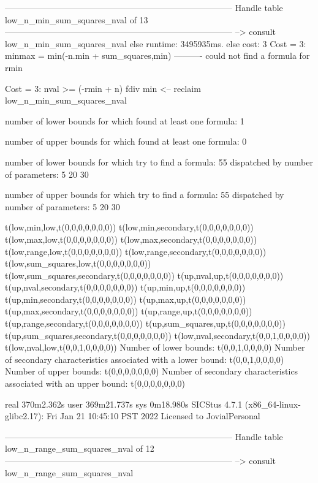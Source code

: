 --------------------------------------------------------------------------------
Handle table low_n_min_sum_squares_nval of 13
--------------------------------------------------------------------------------
--> consult low_n_min_sum_squares_nval
else runtime: 3495935ms. else cost: 3
Cost =  3:  minmax = min(-n.min + sum_squares,min) %
----------
could not find a formula for rmin

Cost =  3:  nval >= (-rmin + n) fdiv min %
<-- reclaim low_n_min_sum_squares_nval

number of lower bounds for which found at least one formula: 1

number of upper bounds for which found at least one formula: 0

number of lower bounds for which try to find a formula: 55
dispatched by number of parameters: 5  20  30

number of upper bounds for which try to find a formula: 55
dispatched by number of parameters: 5  20  30

t(low,min,low,t(0,0,0,0,0,0,0))
t(low,min,secondary,t(0,0,0,0,0,0,0))
t(low,max,low,t(0,0,0,0,0,0,0))
t(low,max,secondary,t(0,0,0,0,0,0,0))
t(low,range,low,t(0,0,0,0,0,0,0))
t(low,range,secondary,t(0,0,0,0,0,0,0))
t(low,sum_squares,low,t(0,0,0,0,0,0,0))
t(low,sum_squares,secondary,t(0,0,0,0,0,0,0))
t(up,nval,up,t(0,0,0,0,0,0,0))
t(up,nval,secondary,t(0,0,0,0,0,0,0))
t(up,min,up,t(0,0,0,0,0,0,0))
t(up,min,secondary,t(0,0,0,0,0,0,0))
t(up,max,up,t(0,0,0,0,0,0,0))
t(up,max,secondary,t(0,0,0,0,0,0,0))
t(up,range,up,t(0,0,0,0,0,0,0))
t(up,range,secondary,t(0,0,0,0,0,0,0))
t(up,sum_squares,up,t(0,0,0,0,0,0,0))
t(up,sum_squares,secondary,t(0,0,0,0,0,0,0))
t(low,nval,secondary,t(0,0,1,0,0,0,0))
t(low,nval,low,t(0,0,1,0,0,0,0))
Number of lower bounds:                                             t(0,0,1,0,0,0,0)
Number of secondary characteristics associated with a lower bound:  t(0,0,1,0,0,0,0)
Number of upper bounds:                                             t(0,0,0,0,0,0,0)
Number of secondary characteristics associated with an upper bound: t(0,0,0,0,0,0,0)

real	370m2.362s
user	369m21.737s
sys	0m18.980s
SICStus 4.7.1 (x86_64-linux-glibc2.17): Fri Jan 21 10:45:10 PST 2022
Licensed to JovialPersonal


--------------------------------------------------------------------------------
Handle table low_n_range_sum_squares_nval of 12
--------------------------------------------------------------------------------
--> consult low_n_range_sum_squares_nval

